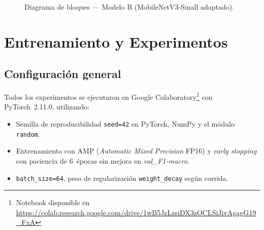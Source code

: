 \documentclass[conference]{IEEEtran}
\begin{document}
\begin{figure}[htbp]
\centering
{}
\caption{Diagrama de bloques — Modelo B (MobileNetV3-Small adaptado).}
\label{fig:arch_mobilenet}
\end{figure}

\section{Entrenamiento y Experimentos}

\subsection{Configuración general}

Todos los experimentos se ejecutaron en Google Colaboratory\footnote{Notebook
disponible en \url{https://colab.research.google.com/drive/1wB5JzLzsiDX3zOCLSiJivAgagG19_FxA}}
con PyTorch~2.11.0, utilizando:
\begin{itemize}
  \item Semilla de reproducibilidad \texttt{seed=42} en PyTorch, NumPy y
        el módulo \texttt{random}.
  \item Entrenamiento con AMP (\textit{Automatic Mixed Precision} FP16) y
        \textit{early stopping} con paciencia de 6~épocas sin mejora en
        \textit{val\_F1-macro}.
  \item \texttt{batch\_size=64}, peso de regularización \texttt{weight\_decay}
        según corrida.
\end{itemize}
\end{document}
